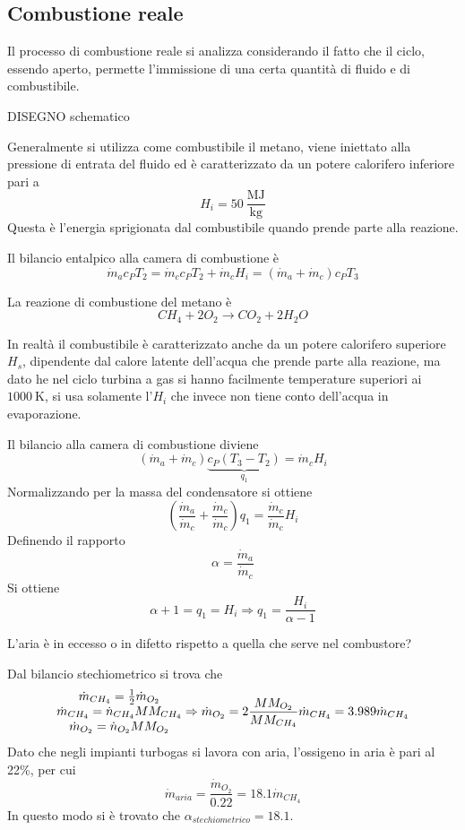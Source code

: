 \subsection{Combustione reale}
\begin{adjustwidth}{2in}{}
	Il processo di combustione reale si analizza considerando il fatto che il ciclo, essendo aperto, permette l'immissione di una certa quantità di fluido e di combustibile. 
	
	DISEGNO schematico
	
	Generalmente si utilizza come combustibile il metano, viene iniettato alla pressione di entrata del fluido ed è caratterizzato da un potere calorifero inferiore pari a 
	\[H_i = 50~\dfrac{\text{MJ}}{\text{kg}}\]
	Questa è l'energia sprigionata dal combustibile quando prende parte alla reazione. \newline 
	
	Il bilancio entalpico alla camera di combustione è 
	\[\dot{m}_ac_PT_2 = \dot{m}_cc_PT_2 + \dot{m}_cH_i = (\dot{m}_a+\dot{m}_c)c_PT_3\]
	
	La reazione di combustione del metano è 
	\[CH_4+2O_2 \rightarrow CO_2 + 2H_2O\]
	
	In realtà il combustibile è caratterizzato anche da un potere calorifero superiore $H_s$, dipendente dal calore latente dell'acqua che prende parte alla reazione, ma dato he nel ciclo turbina a gas si hanno facilmente temperature superiori ai $1000~\text{K}$, si usa solamente l'$H_i$ che invece non tiene conto dell'acqua in evaporazione. \newline 
	
	Il bilancio alla camera di combustione diviene 
	\[(\dot{m}_a+\dot{m}_c)\underbrace{c_P(T_3-T_2)}_{q_1} = \dot{m}_cH_i\] 
	Normalizzando per la massa del condensatore si ottiene 
	\[\left(\dfrac{\dot{m}_a}{\dot{m}_c}+\dfrac{\dot{m}_c}{\dot{m}_c}\right)q_1 = \dfrac{\dot{m}_c}{\dot{m}_c}H_i\] 
	Definendo il rapporto
	\[\alpha = \dfrac{\dot{m}_a}{\dot{m}_c}\]
	Si ottiene 
	\[\alpha + 1 = q_1 = H_i \Rightarrow q_1 = \dfrac{H_i}{\alpha-1}\]
	
	L'aria è in eccesso o in difetto rispetto a quella che serve nel combustore? 
	
	Dal bilancio stechiometrico si trova che 
	\[\begin{aligned}
		\begin{matrix}
			\dot{m}_{CH_4}  =  {1\over2}\dot{m}_{O_2} \\
			\dot{m}_{CH_4}  =  \dot{n}_{CH_4}MM_{CH_4} \\
			\dot{m}_{O_2}  =  \dot{n}_{O_2}MM_{O_2} \\
		\end{matrix}
	\end{aligned}\Rightarrow\dot{m}_{O_2} = 2\dfrac{MM_{O_2}}{MM_{CH_4}}\dot{m}_{CH_4} = 3.989\dot{m}_{CH_4}\]
	Dato che negli impianti turbogas si lavora con aria, l'ossigeno in aria è pari al 22\%, per cui
	\[\dot{m}_{aria} = \dfrac{\dot{m}_{O_2}}{0.22} = 18.1\dot{m}_{CH_4}\]
	In questo modo si è trovato che $\alpha_{stechiometrico} = 18.1$. 
	

\end{adjustwidth}

